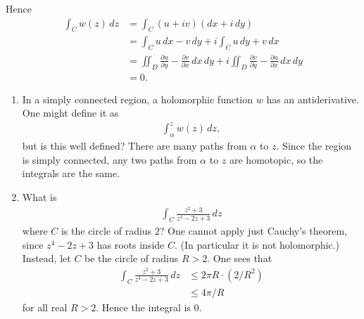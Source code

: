 \documentclass[11pt, oneside,margin=1in]{article}
\begin{document}
Hence 
\begin{align*}
	\int_{C}^{} w(z)  \, dz &=\int_{C}^{} (u+iv) (dx+i\,dy) \\
				&= \int_{C}^{} u\,dx - v  \, dy + i \int_{C}^{} u\, dy + v  \, dx\\
				&= \iint_D \frac{\partial u}{\partial y} - \frac{\partial v}{\partial x}\,dx\,dy + i \iint_D \frac{\partial v}{\partial y} - \frac{\partial u}{\partial x}\,dx\,dy\\
				&= 0.
\end{align*}

\begin{enumerate}
	\item In a simply connected region, a holomorphic function $w$ has an antiderivative. One might define it as
		\begin{align*}
			\int_{\alpha}^{z} w(z)  \, dz, 
		\end{align*}
		but is this well defined? There are many paths from $\alpha$ to $z$. Since the region is simply connected, any two paths from $\alpha$ to $z$ are homotopic, so the integrals are the same. 
	\item What is 
		\begin{align*}
			\int_{C}^{} \frac{z^2+3}{z^4-2z+3}  \, dz 
		\end{align*}
		where $C$ is the circle of radius $2$? One cannot apply just Cauchy's theorem, since $z^4-2z+3$ has roots inside $C$. (In particular it is not holomorphic.) Instead, let $C$ be the circle of radius $R>2$. One sees that
		\begin{align*}
			\int_{C}^{} \frac{z^2 + 3}{z^4-2z+3}  \, dz &\le 2\pi R \cdot (2/R^2) \\
								    &\le 4\pi/R
		\end{align*}
		for all real $R>2$. Hence the integral is $0$.
\end{enumerate}
\end{document}
